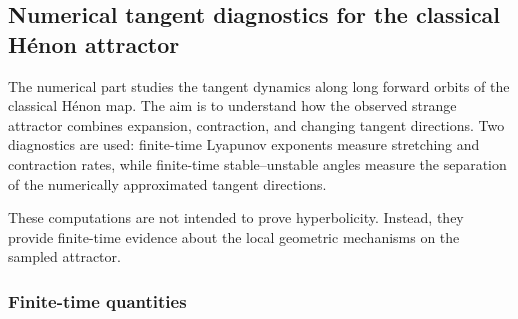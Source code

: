     

\subsection{Numerical tangent diagnostics for the classical Hénon attractor}

The numerical part studies the tangent dynamics along long forward orbits of the classical Hénon map. The aim is to understand how the observed strange attractor combines expansion, contraction, and changing tangent directions. Two diagnostics are used: finite-time Lyapunov exponents measure stretching and contraction rates, while finite-time stable--unstable angles measure the separation of the numerically approximated tangent directions.

These computations are not intended to prove hyperbolicity. Instead, they provide finite-time evidence about the local geometric mechanisms on the sampled attractor.

\subsubsection{Finite-time quantities}

